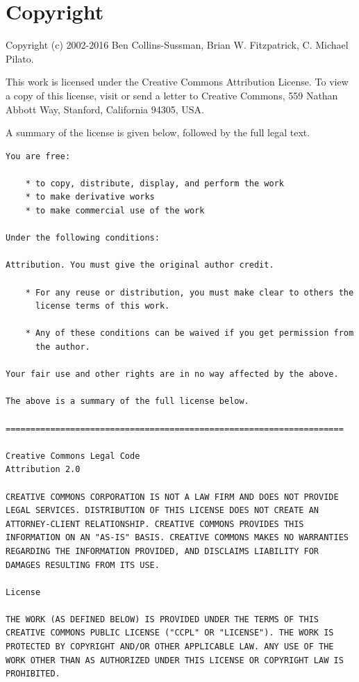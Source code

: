 \chapter{Copyright}\label{svn.copyright}

Copyright (c) 2002-2016 Ben Collins-Sussman, Brian W. Fitzpatrick, C.
Michael Pilato.

This work is licensed under the Creative Commons Attribution License. To
view a copy of this license, visit
\href{http://creativecommons.org/licenses/by/2.0/}{} or send a letter to
Creative Commons, 559 Nathan Abbott Way, Stanford, California 94305,
USA.

A summary of the license is given below, followed by the full legal
text.

\begin{verbatim}
You are free:

    * to copy, distribute, display, and perform the work
    * to make derivative works
    * to make commercial use of the work

Under the following conditions:
    
Attribution. You must give the original author credit.

    * For any reuse or distribution, you must make clear to others the
      license terms of this work.

    * Any of these conditions can be waived if you get permission from
      the author.

Your fair use and other rights are in no way affected by the above.

The above is a summary of the full license below.

====================================================================

Creative Commons Legal Code
Attribution 2.0

CREATIVE COMMONS CORPORATION IS NOT A LAW FIRM AND DOES NOT PROVIDE
LEGAL SERVICES. DISTRIBUTION OF THIS LICENSE DOES NOT CREATE AN
ATTORNEY-CLIENT RELATIONSHIP. CREATIVE COMMONS PROVIDES THIS
INFORMATION ON AN "AS-IS" BASIS. CREATIVE COMMONS MAKES NO WARRANTIES
REGARDING THE INFORMATION PROVIDED, AND DISCLAIMS LIABILITY FOR
DAMAGES RESULTING FROM ITS USE.

License

THE WORK (AS DEFINED BELOW) IS PROVIDED UNDER THE TERMS OF THIS
CREATIVE COMMONS PUBLIC LICENSE ("CCPL" OR "LICENSE"). THE WORK IS
PROTECTED BY COPYRIGHT AND/OR OTHER APPLICABLE LAW. ANY USE OF THE
WORK OTHER THAN AS AUTHORIZED UNDER THIS LICENSE OR COPYRIGHT LAW IS
PROHIBITED.


\end{verbatim}
